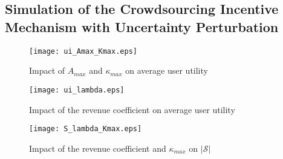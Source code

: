 \documentclass{IEEEtran}
\begin{document}
\subsection{Simulation of the Crowdsourcing Incentive Mechanism with Uncertainty Perturbation}

\begin{figure*}[!t]
\begin{minipage}[b]{0.3\linewidth}
	\centering
	\texttt{[image: ui\_Amax\_Kmax.eps]}
	\caption{Impact of $A_{max}$ and $\kappa_{max}$ on average user utility}
	\label{fig:ui_Amax_Kmax}
\end{minipage}
\hspace{0.2cm}
\begin{minipage}[b]{0.3\linewidth}
	\centering
	\texttt{[image: ui\_lambda.eps]}
	\caption{Impact of the revenue coefficient on average user utility}
	\label{fig:ui_lambda}
\end{minipage}
\hspace{0.2cm}
\begin{minipage}[b]{0.3\linewidth}
	\centering
	\texttt{[image: S\_lambda\_Kmax.eps]}
	\caption{Impact of the revenue coefficient and $\kappa_{max}$ on $|\mathcal{S}|$}
	\label{fig:S_lambda_Kmax}
\end{minipage}
\end{figure*}
\end{document}
